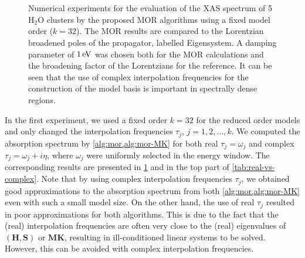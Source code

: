 \begin{figure}[hbtp]
%
\\[10pt]
%
\\[10pt]
\caption{Numerical experiments for the evaluation of the XAS spectrum of 5 H$_2$O
clusters by the proposed MOR algorithms using a fixed model order ($k = 32$).
The MOR results are compared to the Lorentzian broadened poles of the
propagator, labelled Eigensystem. A damping parameter of $1\,\mathrm{eV}$ was chosen both
for the MOR calculations and the broadening factor of the Lorentzians for the
reference. It can be seen that the use of complex interpolation frequencies
for the construction of the model basis is important in spectrally dense
regions.}
\label{fig:fixed}
\end{figure}

In the first experiment, we used a fixed order $k = 32$ for the reduced order models and only changed the interpolation frequencies $\tau_j$, $j = 1,2,\ldots,k$. We computed the absorption spectrum by \cref{alg:mor,alg:mor-MK} for both real $\tau_j = \omega_j$ and complex $\tau_j = \omega_j + i\eta$, where $\omega_j$ were uniformly selected in the energy window. The corresponding results are presented in \cref{fig:fixed} and in the top part of \cref{tab:real-vs-complex}. Note that by using complex interpolation frequencies $\tau_j$, we obtained  good approximations to the absorption spectrum from both \cref{alg:mor,alg:mor-MK} even with such a small model size. On the other hand, the use of real $\tau_j$ resulted in poor approximations for both algorithms. This is due to the fact that the (real) interpolation frequencies are often very close to the (real) eigenvalues of $(\mathbf{H},\mathbf{S})$ or $\mathbf{M}\mathbf{K}$, resulting in ill-conditioned linear systems to be solved. However, this can be avoided with complex interpolation frequencies.

